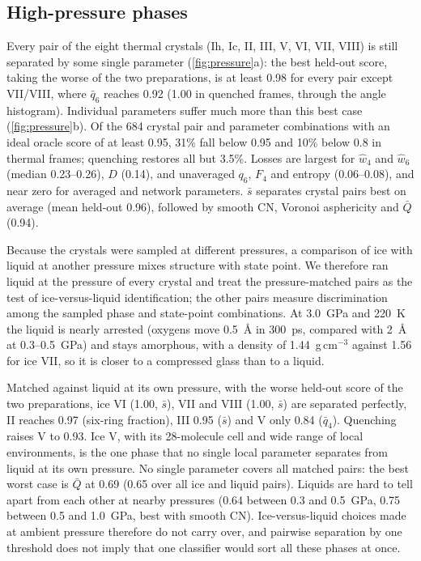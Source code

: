 \documentclass[11pt,a4paper]{article}
\begin{document}
\subsection{High-pressure phases}\label{sec:pressure}
Every pair of the eight thermal crystals (Ih, Ic, II, III, V, VI, VII, VIII)
is still separated by some single parameter (\cref{fig:pressure}a): the best
held-out score, taking the worse of the two preparations, is at least 0.98
for every pair except VII/VIII, where $\bar q_6$ reaches 0.92 (1.00 in
quenched frames, through the angle histogram). Individual parameters suffer
much more than this best case (\cref{fig:pressure}b). Of the 684 crystal pair
and parameter combinations with an ideal oracle score of at least 0.95, 31\%
fall below 0.95 and 10\% below 0.8 in thermal frames; quenching restores all
but 3.5\%. Losses are largest for $\hat w_4$ and $\hat w_6$ (median
0.23--0.26), $D$ (0.14), and unaveraged $q_6$, $F_4$ and entropy
(0.06--0.08), and near zero for averaged and network parameters. $\bar s$
separates crystal pairs best on average (mean held-out 0.96), followed by
smooth CN, Voronoi asphericity and $\bar Q$ (0.94).

Because the crystals were sampled at different pressures, a comparison of
ice with liquid at another pressure mixes structure with state point. We
therefore ran liquid at the pressure of every crystal and treat the
pressure-matched pairs as the test of ice-versus-liquid identification; the
other pairs measure discrimination among the sampled phase and state-point
combinations. At 3.0~GPa and 220~K the liquid is nearly arrested (oxygens
move 0.5~\AA{} in 300~ps, compared with 2~\AA{} at 0.3--0.5~GPa) and stays
amorphous, with a density of 1.44~g\,cm$^{-3}$ against 1.56 for ice VII, so it
is closer to a compressed glass than to a liquid.

Matched against liquid at its own pressure, with the worse held-out score of
the two preparations, ice VI (1.00, $\bar s$), VII and VIII (1.00, $\bar s$)
are separated perfectly, II reaches 0.97 (six-ring fraction), III 0.95
($\bar s$) and V only 0.84 ($\bar q_4$). Quenching raises V to 0.93. Ice V,
with its 28-molecule cell and wide range of local environments, is the one
phase that no single local parameter separates from liquid at its own
pressure. No single parameter covers all matched pairs: the best worst case
is $\bar Q$ at 0.69 (0.65 over all ice and liquid pairs). Liquids are hard to
tell apart from each other at nearby pressures (0.64 between 0.3 and 0.5~GPa,
0.75 between 0.5 and 1.0~GPa, best with smooth CN). Ice-versus-liquid choices
made at ambient pressure therefore do not carry over, and pairwise separation
by one threshold does not imply that one classifier would sort all these
phases at once.
\end{document}
